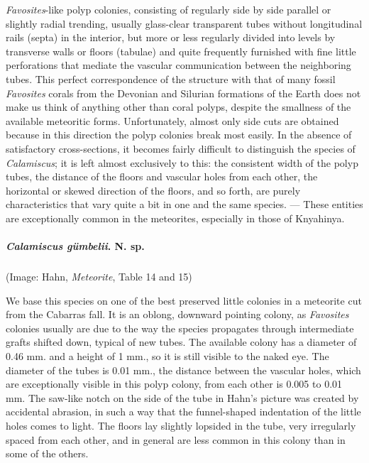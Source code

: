 \documentclass[a4paper, 12pt, oneside]{article}
\begin{document}
\emph{Favosites}-like polyp colonies, consisting of regularly side by side parallel or slightly radial trending, usually glass-clear transparent tubes without longitudinal rails (septa) in the interior, but more or less regularly divided into levels by transverse walls or floors (tabulae) and quite frequently furnished with fine little perforations that mediate the vascular communication between the neighboring tubes. This perfect correspondence of the structure with that of many fossil \emph{Favosites} corals from the Devonian and Silurian formations of the Earth does not make us think of anything other than coral polyps, despite the smallness of the available meteoritic forms. Unfortunately, almost only side cuts are obtained because in this direction the polyp colonies break most easily. In the absence of satisfactory cross-sections, it becomes fairly difficult to distinguish the species of \emph{Calamiscus}; it is left almost exclusively to this: the consistent width of the polyp tubes, the distance of the floors and vascular holes from each other, the horizontal or skewed direction of the floors, and so forth, are purely characteristics that vary quite a bit in one and the same species. --- These entities are exceptionally common in the meteorites, especially in those of Knyahinya.
\paragraph{\emph{Calamiscus gümbelii}. N. sp.}
\subparagraph{}
(Image: Hahn, \emph{Meteorite}, Table 14 and 15)

We base this species on one of the best preserved little colonies in a meteorite cut from the Cabarras fall. It is an oblong, downward pointing colony, as \emph{Favosites} colonies usually are due to the way the species propagates through intermediate grafts shifted down, typical of new tubes. The available colony has a diameter of 0.46 mm. and a height of 1 mm., so it is still visible to the naked eye. The diameter of the tubes is 0.01 mm., the distance between the vascular holes, which are exceptionally visible in this polyp colony, from each other is 0.005 to 0.01 mm. The saw-like notch on the side of the tube in Hahn's picture was created by accidental abrasion, in such a way that the funnel-shaped indentation of the little holes comes to light. The floors lay slightly lopsided in the tube, very irregularly spaced from each other, and in general are less common in this colony than in some of the others.
\end{document}
